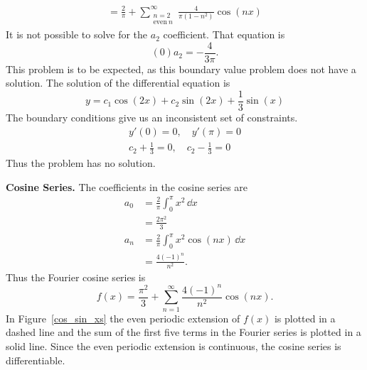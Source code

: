 {\begin{Solution}
\begin{enumerate}
\begin{gather*}
      = \frac{2}{\pi} 
      + \sum_{\substack{n = 2 \\ \mathrm{even}\ n}}^\infty \frac{ 4 }{ \pi (1 - n^2) } \cos(n x)
    \end{gather*}
    It is not possible to solve for the $a_2$ coefficient.  That equation is
    \[
    (0) a_2 = - \frac{4}{3 \pi}.
    \]
    This problem is to be expected, as this boundary value problem does not 
    have a solution.
    The solution of the differential equation is
    \[
    y  = c_1 \cos(2 x) + c_2 \sin(2 x) + \frac{1}{3} \sin(x)
    \]
    The boundary conditions give us an inconsistent set of constraints.
    \begin{gather*}
      y'(0) = 0, \quad y'(\pi) = 0
      \\
      c_2 + \frac{1}{3} = 0, \quad c_2 - \frac{1}{3} = 0
    \end{gather*}
    Thus the problem has no solution.
  \end{enumerate}
\end{Solution}









\begin{Solution}

  \textbf{Cosine Series.}
  The coefficients in the cosine series are
  \begin{align*}
    a_0     &= \frac{2}{\pi} \int_0^\pi x^2\,\dd x \\
    &= \frac{2 \pi^2}{3} \\
    a_n     &= \frac{2}{\pi} \int_0^\pi x^2 \cos(n x)\,\dd x \\
    &= \frac{4(-1)^n}{n^2}.
  \end{align*}
  Thus the Fourier cosine series is
  \[ f(x) = \frac{\pi^2}{3} + \sum_{n = 1}^\infty \frac{4(-1)^n}{n^2} \cos(n x).\]
  In Figure~\ref{cos_sin_xs} the even periodic extension of $f(x)$ is plotted
  in a dashed line and the sum of the first five terms in the Fourier
  series is plotted in a solid line.
  Since the even periodic extension is continuous, the cosine series is
  differentiable.


\end{Solution}}
